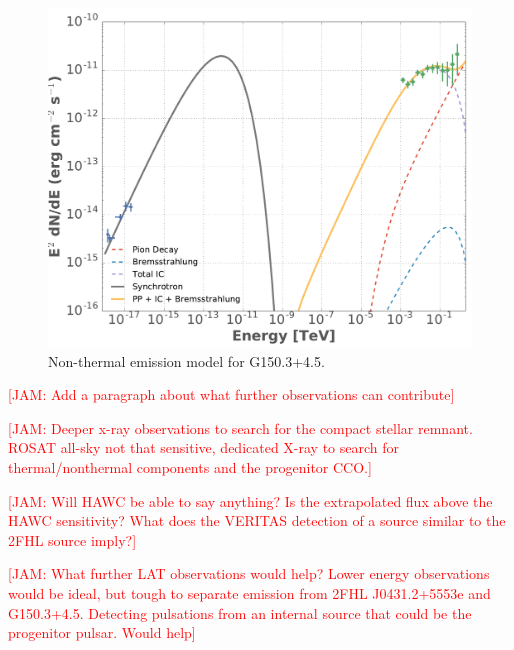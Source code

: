 \documentclass[iop]{emulateapj}
\newcommand{\kibitz}[2]{\ifnum\Comments=1\textcolor{#1}{#2}\fi}
\newcommand{\jamie}[1]{\kibitz{red}      {[JAM: #1]}}
\newcommand{\Gone}{G150.3+4.5}
\newcommand{\ghard}{2FHL J0431.2+5553e}
\begin{document}
\begin{figure}[!ht]
	\begin{centering}
		\includegraphics[width=\columnwidth]{Figures/G150_ICsyncBremss_PP_SED.pdf}
		\caption[Non-thermal emission model for \Gone{}]{ Non-thermal emission model for \Gone{}. 
			\label{fig:naimaSED}}
	\end{centering}
\end{figure}

\jamie{Add a paragraph about what further observations can contribute}


\jamie{Deeper x-ray observations to search for the compact stellar remnant. ROSAT all-sky not that sensitive, dedicated X-ray to search for thermal/nonthermal components and the progenitor CCO.}

\jamie{Will HAWC be able to say anything? Is the extrapolated flux above the HAWC sensitivity? What does the VERITAS detection of a source similar to the 2FHL source imply?}

\jamie{What further LAT observations would help? Lower energy observations would be ideal, but tough to separate emission from \ghard{} and \Gone{}. Detecting pulsations from an internal source that could be the progenitor pulsar. Would help}

\end{document}
